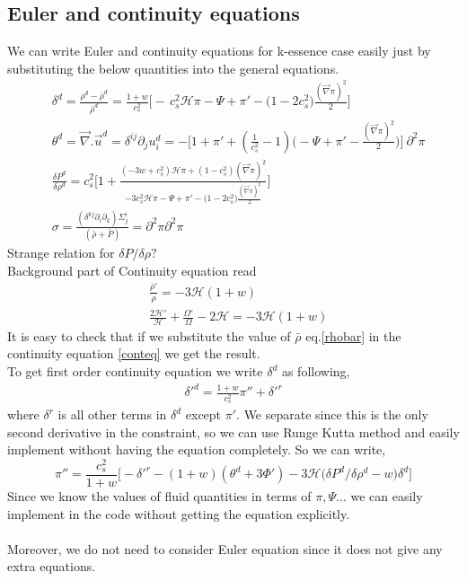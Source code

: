 \documentclass[a4paper,14pt]{article}
\newcommand {\be}{\begin{equation}}
\newcommand {\ee}{\end{equation}}
\begin{document}
\subsection{Euler and continuity equations}
We can write Euler and continuity equations for k-essence case easily just by substituting the below quantities into the general equations.
\begin{align} 
 & \delta^{d} =\frac{\rho^d -\bar{\rho }^d}{\bar{\rho}^d} =  \frac{1+w}{c_s^2} \Bigg[ -  \, c_s^2 \mathcal{H} \pi- \Psi+   {\pi'}  -  \Big(1-2 c_s^2 \Big) 
 \frac{(\vec{\nabla} \pi)^2}{2}   \Bigg] 
 \nonumber
   \\ 
   &
 \theta^d=\vec{\nabla} .\vec{u}^d=\delta^{ij} \partial_j u_i ^d=- \Big[1+ \pi' +(\frac{1}{c_s^2} -1) \Big(-\Psi +\pi' - \frac{(\vec{\nabla} \pi)^2}{2}  \Big ) \Big ] \ \partial ^2 \pi  
  \nonumber
   \\ 
   &
   \frac{\delta P ^{d} }{ \delta \rho^{d} }=  c_s^2 \Bigg [1 +\frac{ (-3 w +c_s^2)\mathcal {H} \pi + (1-c_s^2) (\vec{\nabla} \pi)^2   }{ - 3c_s^2 \mathcal{H} \pi- \Psi+   {\pi'}  -  \Big(1-2 c_s^2 \Big) 
 \frac{(\vec{\nabla} \pi)^2}{2}  }
\Bigg ]
   \nonumber
   \\ 
   &
   \sigma=\frac{(\delta ^{kj} \partial_i \partial_k )\Sigma_j^i}{(\bar{\rho} +\bar{P} )} =\partial^2 \pi \partial^2 \pi
 \end{align} \label{imp_2}
 {\color{red} {Strange relation for $\delta P/\delta \rho?$}} \\
 Background part of Continuity equation read \\
 \begin{align} \label{Conteqgg}
& \frac{\bar{\rho}' }{\rho}=- 3 \mathcal{H} (1+w) \\ \nonumber &
 \frac{2\mathcal{H}'}{\mathcal{H}} + \frac{\Omega'}{\Omega}-2 \mathcal{H}=- 3 \mathcal{H} (1+w) \end{align}
 It is easy to check that if we substitute the value of $\bar{\rho}$ eq.\ref{rhobar} in the continuity equation \ref{conteq} we get the result. \\
 To get first order continuity equation we write $\delta^d$ as following,
 \begin{align}
 \delta'^{d}= \frac{1+w}{c_s^2} \pi''+ \delta'^{r} 
 \end{align} 
 where $\delta^ r$ is all other terms in $\delta^{d}$ except $\pi'$. We separate since this is the only second derivative in the constraint, so we can use Runge Kutta method and easily implement without having the equation completely. So we can write,
 \be
 \pi'' = \frac{c_s^2}{1+w} \Bigg[ -\delta'^r-(1+w) (\theta^{d}  + 3 \Phi ') -3 \mathcal{H} \Big({\delta P^{d}/\delta \rho^{d}} -w \Big)\delta^{d}     \Bigg]
 \ee
 Since we know the values of fluid quantities in terms of $\pi, \Psi...$ we can easily implement in the code without getting the equation explicitly. \\
 {\color{red}{We should check that this equation gives the same constraint as field constraint in EFT form for k-essence case.}} \\
 Moreover, we do not need to consider Euler equation since it does not give any extra equations.
\end{document}
